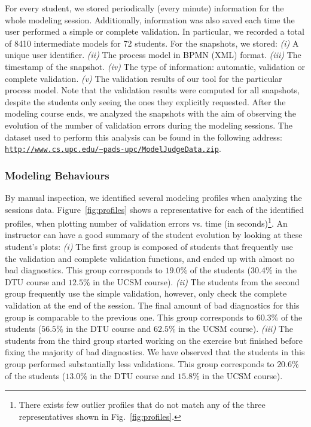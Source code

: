 For every student, we stored periodically (every minute) information for the whole modeling session. Additionally, information was also saved each time the user performed a simple or complete validation. In particular, we recorded a total of 8410 intermediate models for 72 students. For the snapshots, we stored: \textit{(i)} A unique user identifier. \textit{(ii)} The process model in BPMN (XML) format. \textit{(iii)} The timestamp of the snapshot. \textit{(iv)} The type of information: automatic, validation or complete validation. \textit{(v)} The validation results of our tool for the particular process model. Note that the validation results were computed for all snapshots, despite the students only seeing the ones they explicitly requested. 
After the modeling course ends, we analyzed the snapshots with the aim of observing the evolution of the number of validation errors during the modeling sessions. The dataset used to perform this analysis can be found in the following address: \texttt{\url{http://www.cs.upc.edu/~pads-upc/ModelJudgeData.zip}}.

\subsubsection{Modeling Behaviours}

By manual inspection, we identified several modeling profiles when analyzing the sessions data.
Figure~\ref{fig:profiles} shows a representative for each of the identified profiles, when plotting number of validation errors vs.
time (in seconds)\footnote{There exists few outlier profiles that do not match any of the three representatives shown in Fig.~\ref{fig:profiles}.}.
An instructor can have a good summary of the student evolution by looking at these student's plots:
\emph{(i)} The first group is composed of students that frequently use the validation and complete validation functions, and ended up with almost no bad diagnostics. This group corresponds to $19.0\%$ of the students ($30.4\%$ in the DTU course and $12.5\%$ in the UCSM course).
\emph{(ii)} The students from the second group frequently use the simple validation, however, only check the complete validation at the end of the session. The final amount of bad diagnostics for this group is comparable to the previous one. This group corresponds to $60.3\%$ of the students ($56.5\%$ in the DTU course and $62.5\%$ in the UCSM course).
\emph{(iii)} The students from the third group started working on the exercise but finished before fixing the majority of bad diagnostics. We have observed that the students in this group performed substantially less validations. This group corresponds to $20.6\%$ of the students ($13.0\%$ in the DTU course and $15.8\%$ in the UCSM course).

